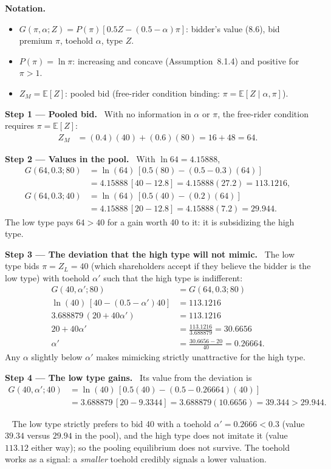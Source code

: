 \documentclass[11pt,a4paper]{article}
\newcommand{\notation}{\par\noindent\textbf{Notation.}}
\newcommand{\step}[2]{\par\medskip\noindent\textbf{Step #1 --- #2.}~}
\newcommand{\answer}[1]{\par\smallskip\noindent\fbox{\textbf{Answer #1.}}~}
\newcommand{\E}{\mathbb{E}}
\begin{document}
\notation
\begin{itemize}
  \item $G(\pi,\alpha;Z)=P(\pi)[0.5Z-(0.5-\alpha)\pi]$: bidder's value (8.6), bid premium $\pi$, toehold $\alpha$, type $Z$.
  \item $P(\pi)=\ln\pi$: increasing and concave (Assumption~8.1.4) and positive for $\pi>1$.
  \item $Z_M=\E[Z]$: pooled bid (free-rider condition binding: $\pi=\E[Z\mid\alpha,\pi]$).
\end{itemize}

\step{1}{Pooled bid} With no information in $\alpha$ or $\pi$, the free-rider condition requires
$\pi=\E[Z]$:
\begin{align}
  Z_M &= (0.4)(40)+(0.6)(80) = 16+48 = 64. \label{r9e10-ZM}
\end{align}

\step{2}{Values in the pool} With $\ln 64=4.15888$,
\begin{align}
  G(64,0.3;80) &= \ln(64)\,[0.5(80)-(0.5-0.3)(64)] \nonumber\\
               &= 4.15888\,[40-12.8] = 4.15888(27.2)=113.1216, \label{r9e10-GH}\\
  G(64,0.3;40) &= \ln(64)\,[0.5(40)-(0.2)(64)] \nonumber\\
               &= 4.15888\,[20-12.8] = 4.15888(7.2)=29.944. \label{r9e10-GL}
\end{align}
The low type pays $64>40$ for a gain worth 40 to it: it is subsidizing the high type.

\step{3}{The deviation that the high type will not mimic} The low type bids $\pi=Z_L=40$ (which
shareholders accept if they believe the bidder is the low type) with toehold $\alpha'$ such that the high
type is indifferent:
\begin{align}
  G(40,\alpha';80) &= G(64,0.3;80) \nonumber\\
  \ln(40)\,[40-(0.5-\alpha')40] &= 113.1216 \nonumber\\
  3.688879\,(20+40\alpha') &= 113.1216 \nonumber\\
  20+40\alpha' &= \frac{113.1216}{3.688879} = 30.6656 \nonumber\\
  \alpha' &= \frac{30.6656-20}{40} = 0.26664. \label{r9e10-ap}
\end{align}
Any $\alpha$ slightly below $\alpha'$ makes mimicking strictly unattractive for the high type.

\step{4}{The low type gains} Its value from the deviation is
\begin{align}
  G(40,\alpha';40) &= \ln(40)\,[0.5(40)-(0.5-0.26664)(40)] \nonumber\\
                   &= 3.688879\,[20-9.3344] = 3.688879(10.6656) = 39.344 > 29.944. \label{r9e10-dev}
\end{align}
\answer{(\#8)} The low type strictly prefers to bid 40 with a toehold $\alpha'=0.2666<0.3$ (value $39.34$
versus $29.94$ in the pool), and the high type does not imitate it (value $113.12$ either way); so the
pooling equilibrium does not survive. The toehold works as a signal: a \emph{smaller} toehold credibly
signals a lower valuation.
\end{document}
